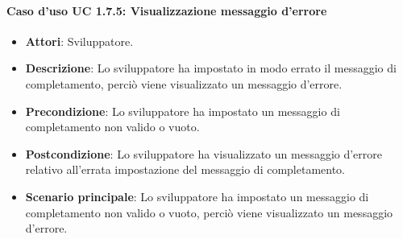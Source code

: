 \paragraph{Caso d'uso UC 1.7.5: Visualizzazione messaggio d'errore}

\FloatBarrier
\begin{itemize}
\item\textbf{Attori}: Sviluppatore.
\item\textbf{Descrizione}: Lo sviluppatore ha impostato in modo errato il messaggio di completamento, perciò viene visualizzato un messaggio d'errore.
\item\textbf{Precondizione}: Lo sviluppatore ha impostato un messaggio di completamento non valido o vuoto.
\item\textbf{Postcondizione}: Lo sviluppatore ha visualizzato un messaggio d'errore relativo all'errata impostazione del messaggio di completamento.
\item\textbf{Scenario principale}: Lo sviluppatore ha impostato un messaggio di completamento non valido o vuoto, perciò viene visualizzato un messaggio d'errore.
\end{itemize}
